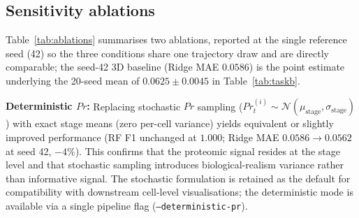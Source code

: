 \documentclass[5p,times,twocolumn]{elsarticle}
\begin{document}
\subsection{\textbf{Sensitivity ablations}}
\label{sec:res_ablations}

\begin{table}[!htbp]
\caption{%
  Sensitivity ablations on state-space design choices,
  reported at the single reference seed (42) so that the
  three conditions are directly comparable under one
  trajectory draw; the ``3D stochastic $Pr$'' row is the
  seed-42 point estimate of the 3D condition tabulated as a
  20-seed mean in Tables~\ref{tab:taskb}--\ref{tab:taskb_perdim}.
  Lower Task B MAE is better.}
\label{tab:ablations}
\centering
{}
\end{table}

Table~\ref{tab:ablations} summarises two ablations, reported at
the single reference seed (42) so the three conditions share one
trajectory draw and are directly comparable; the seed-42 3D
baseline (Ridge MAE $0.0586$) is the point estimate underlying
the 20-seed mean of $0.0625 \pm 0.0045$ in
Table~\ref{tab:taskb}.

\textbf{Deterministic $Pr$:}
Replacing stochastic $Pr$ sampling
($Pr^{(i)}_{t} \sim \mathcal{N}(\mu_{\text{stage}},
\sigma_{\text{stage}})$) with exact stage means
(zero per-cell variance) yields equivalent or slightly improved
performance (RF F1 unchanged at $1.000$; Ridge MAE
$0.0586 \to 0.0562$ at seed 42, $-4\%$).
This confirms that the proteomic signal resides at the stage
level and that stochastic sampling introduces
biological-realism variance rather than informative signal.
The stochastic formulation is retained as the default for
compatibility with downstream cell-level visualisations; the
deterministic mode is available via a single pipeline flag
(\texttt{--deterministic-pr}).
\end{document}
